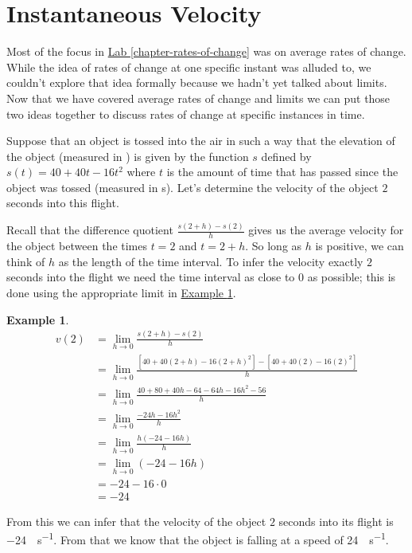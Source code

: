 \documentclass[10pt,oneside,]{book}
\theoremstyle{plain}
\theoremstyle{definition}
\newtheorem{example}[theorem]{Example}
\numberwithin{equation}{section}
\newcommand{\fe}[2]{#1\mathopen{}\left(#2\right)\mathclose{}}
\begin{document}
\section[Instantaneous Velocity]{Instantaneous Velocity}\label{section-instantaneous-velocity}
Most of the focus in \hyperref[chapter-rates-of-change]{Lab \ref{chapter-rates-of-change}} was on average rates of change. While the idea of rates of change at one specific instant was alluded to, we couldn't explore that idea formally because we hadn't yet talked about limits. Now that we have covered average rates of change and limits we can put those two ideas together to discuss rates of change at specific instances in time.%
\par
Suppose that an object is tossed into the air in such a way that the elevation of the object (measured in \si{\foot}) is given by the function \(s\) defined by \(\fe{s}{t}=40+40t-16t^2\) where \(t\) is the amount of time that has passed since the object was tossed (measured in \si{\second}). Let's determine the velocity of the object \(2\) seconds into this flight.%
\par
Recall that the difference quotient \(\frac{\fe{s}{2+h}-\fe{s}{2}}{h}\) gives us the average velocity for the object between the times \(t=2\) and \(t=2+h\). So long as \(h\) is positive, we can think of \(h\) as the length of the time interval. To infer the velocity exactly \(2\) seconds into the flight we need the time interval as close to \(0\) as possible; this is done using the appropriate limit in \hyperref[example-instantaneous-velocity]{Example \ref{example-instantaneous-velocity}}.%
\begin{example}\label{example-instantaneous-velocity}
\begin{align*}
\fe{v}{2}&=\lim_{h\to0}\frac{\fe{s}{2+h}-\fe{s}{2}}{h}\\
&=\lim_{h\to0}\frac{\left[40+40\left(2+h\right)-16\left(2+h\right)^2\right]-\left[40+40(2)-16(2)^2\right]}{h}\\
&=\lim_{h\to0}\frac{40+80+40h-64-64h-16h^2-56}{h}\\
&=\lim_{h\to0}\frac{-24h-16h^2}{h}\\
&=\lim_{h\to0}\frac{h\left(-24-16h\right)}{h}\\
&=\lim_{h\to0}\left(-24-16h\right)\\
&=-24-16\cdot0\\
&=-24
\end{align*}%
\par
From this we can infer that the velocity of the object \(2\) seconds into its flight is \SI{-24}{\foot\per\second}. From that we know that the object is falling at a speed of \SI{24}{\foot\per\second}.%
\end{example}
\typeout{************************************************}
\typeout{************************************************}
\end{document}
